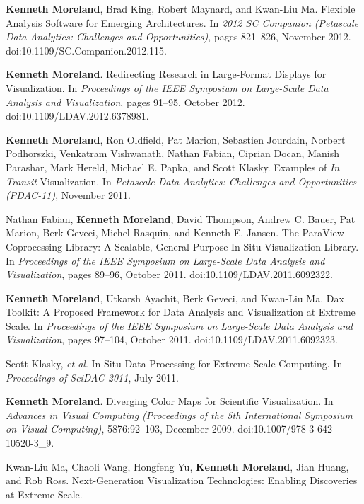 \begin{enumerate}[label={[\arabic*]}, left=0pt]
  \textbf{Kenneth Moreland}, Brad King, Robert Maynard, and Kwan-Liu Ma.
  Flexible Analysis Software for Emerging Architectures.
  In \emph{2012 SC Companion (Petascale Data Analytics: Challenges and Opportunities)}, pages 821--826, November 2012.
  doi:10.1109/SC.Companion.2012.115.
\item  %
  \textbf{Kenneth Moreland}.
  Redirecting Research in Large-Format Displays for Visualization.
  In \emph{Proceedings of the IEEE Symposium on Large-Scale Data Analysis and Visualization}, pages 91--95, October 2012.
  doi:10.1109/LDAV.2012.6378981.
\item  %
  \textbf{Kenneth Moreland}, Ron Oldfield, Pat Marion, Sebastien Jourdain, Norbert Podhorszki, Venkatram Vishwanath, Nathan Fabian, Ciprian Docan, Manish Parashar, Mark Hereld, Michael E. Papka, and Scott Klasky.
  Examples of {\it In Transit} Visualization.
  In \emph{Petascale Data Analytics: Challenges and Opportunities (PDAC-11)}, November 2011.
\item  %
  Nathan Fabian, \textbf{Kenneth Moreland}, David Thompson, Andrew C. Bauer, Pat Marion, Berk Geveci, Michel Rasquin, and Kenneth E. Jansen.
  The {ParaView} Coprocessing Library: A Scalable, General Purpose In Situ Visualization Library.
  In \emph{Proceedings of the IEEE Symposium on Large-Scale Data Analysis and Visualization}, pages 89--96, October 2011.
  doi:10.1109/LDAV.2011.6092322.
\item  %
  \textbf{Kenneth Moreland}, Utkarsh Ayachit, Berk Geveci, and Kwan-Liu Ma.
  Dax Toolkit: A Proposed Framework for Data Analysis and Visualization at Extreme Scale.
  In \emph{Proceedings of the IEEE Symposium on Large-Scale Data Analysis and Visualization}, pages 97--104, October 2011.
  doi:10.1109/LDAV.2011.6092323.
\item  %
  Scott Klasky, \emph{et al}.
  In Situ Data Processing for Extreme Scale Computing.
  In \emph{Proceedings of SciDAC 2011}, July 2011.
\item  %
  \textbf{Kenneth Moreland}.
  Diverging Color Maps for Scientific Visualization.
  In \emph{Advances in Visual Computing (Proceedings of the 5th International Symposium on Visual Computing)}, 5876:92--103, December 2009.
  doi:10.1007/978-3-642-10520-3\_9.
\item  %
  Kwan-Liu Ma, Chaoli Wang, Hongfeng Yu, \textbf{Kenneth Moreland}, Jian Huang, and Rob Ross.
  Next-Generation Visualization Technologies: Enabling Discoveries at Extreme Scale.

\end{enumerate}
